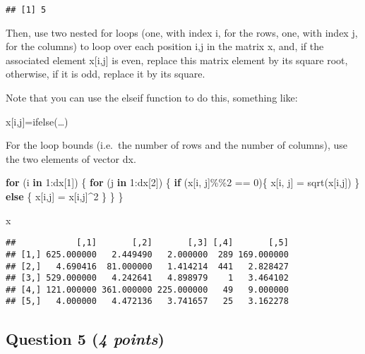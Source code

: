 \documentclass[
]{article}
\newenvironment{Shaded}{\begin{snugshade}}{\end{snugshade}}
\newcommand{\ControlFlowTok}[1]{\textcolor[rgb]{0.13,0.29,0.53}{\textbf{#1}}}
\newcommand{\DecValTok}[1]{\textcolor[rgb]{0.00,0.00,0.81}{#1}}
\newcommand{\FunctionTok}[1]{\textcolor[rgb]{0.00,0.00,0.00}{#1}}
\newcommand{\NormalTok}[1]{#1}
\newcommand{\OtherTok}[1]{\textcolor[rgb]{0.56,0.35,0.01}{#1}}
\newcommand{\SpecialCharTok}[1]{\textcolor[rgb]{0.00,0.00,0.00}{#1}}
\begin{document}
\begin{verbatim}
## [1] 5
\end{verbatim}

Then, use two nested for loops (one, with index i, for the rows, one,
with index j, for the columns) to loop over each position i,j in the
matrix x, and, if the associated element x{[}i,j{]} is even, replace
this matrix element by its square root, otherwise, if it is odd, replace
it by its square.

Note that you can use the elseif function to do this, something like:

x{[}i,j{]}=ifelse(\ldots)

For the loop bounds (i.e.~the number of rows and the number of columns),
use the two elements of vector dx.

\begin{Shaded}
\begin{Highlighting}[]
\ControlFlowTok{for}\NormalTok{ (i }\ControlFlowTok{in} \DecValTok{1}\SpecialCharTok{:}\NormalTok{dx[}\DecValTok{1}\NormalTok{]) \{}
  \ControlFlowTok{for}\NormalTok{ (j }\ControlFlowTok{in} \DecValTok{1}\SpecialCharTok{:}\NormalTok{dx[}\DecValTok{2}\NormalTok{]) \{}
    \ControlFlowTok{if}\NormalTok{ (x[i, j]}\SpecialCharTok{\%\%}\DecValTok{2} \SpecialCharTok{==} \DecValTok{0}\NormalTok{)\{}
\NormalTok{      x[i, j] }\OtherTok{=} \FunctionTok{sqrt}\NormalTok{(x[i,j])}
\NormalTok{    \} }\ControlFlowTok{else}\NormalTok{ \{}
\NormalTok{      x[i,j] }\OtherTok{=}\NormalTok{ x[i,j]}\SpecialCharTok{\^{}}\DecValTok{2}
\NormalTok{    \}}
\NormalTok{  \}}
\NormalTok{\}}

\NormalTok{x}
\end{Highlighting}
\end{Shaded}

\begin{verbatim}
##            [,1]       [,2]       [,3] [,4]       [,5]
## [1,] 625.000000   2.449490   2.000000  289 169.000000
## [2,]   4.690416  81.000000   1.414214  441   2.828427
## [3,] 529.000000   4.242641   4.898979    1   3.464102
## [4,] 121.000000 361.000000 225.000000   49   9.000000
## [5,]   4.000000   4.472136   3.741657   25   3.162278
\end{verbatim}

\hypertarget{question-5-4-points}{%
\subsection{\texorpdfstring{Question 5 (\emph{4
points})}{Question 5 (4 points)}}\label{question-5-4-points}}
\end{document}
